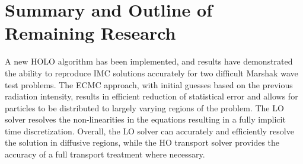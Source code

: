 \documentclass[11pt]{article}
\begin{document}
\section{Summary and Outline of Remaining Research}
\label{sec:summary}

A new HOLO algorithm has been implemented, and results have demonstrated the ability
to reproduce IMC solutions accurately for two difficult Marshak
wave test problems.  The ECMC approach, with initial guesses based on the
previous radiation intensity, results in efficient reduction of statistical error and
allows for particles to be distributed to largely varying regions of the problem.
The LO solver resolves the non-linearities in the equations resulting in a fully
implicit time discretization. Overall, the LO solver 
can accurately and efficiently resolve the solution in diffusive regions, while the HO
transport solver provides the accuracy of a full transport treatment where necessary. 
\end{document}

